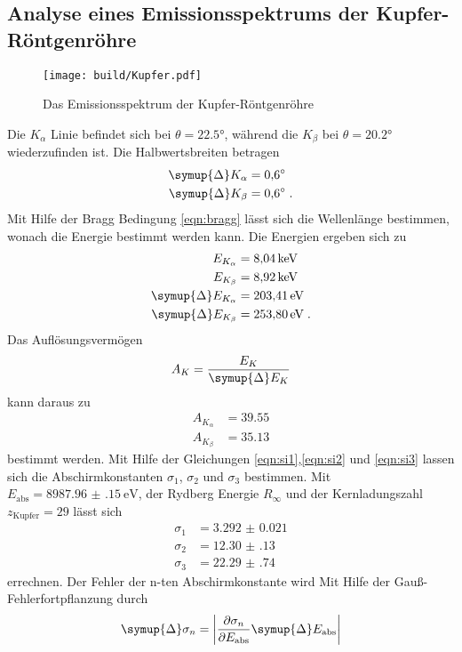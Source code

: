 \subsection{Analyse eines Emissionsspektrums der Kupfer-Röntgenröhre}
\begin{figure}
    \centering
    \caption{Das Emissionsspektrum der Kupfer-Röntgenröhre}
    \label{fig:Kupfer}
    \texttt{[image: build/Kupfer.pdf]}
\end{figure}
Die $K_\alpha$ Linie befindet sich bei  $\theta = \ang{22.5;;}$, während die $K_\beta$ bei  $\theta = \ang{20.2;;}$ wiederzufinden ist.
Die Halbwertsbreiten betragen
\begin{align*}
    \symup{\Delta}K_\alpha  &= \ang{0.6;;} \\
    \symup{\Delta}K_\beta   &= \ang{0.6;;} \; \text{.}
\end{align*}
Mit Hilfe der Bragg Bedingung \eqref{eqn:bragg} lässt sich die Wellenlänge bestimmen, wonach die Energie bestimmt werden kann.
Die Energien ergeben sich zu 
\begin{align*}
    E_{K_\alpha} & =  \SI{8.04}{\kilo\electronvolt} \\
    E_{K_\beta}  & =  \SI{8.92}{\kilo\electronvolt} \\
    \symup{\Delta}E_{K_\alpha} &= \SI{203.41}{\electronvolt} \\
    \symup{\Delta}E_{K_\beta}  &= \SI{253.80}{\electronvolt} \; \text{.}
\end{align*}
Das Auflösungsvermögen 
\begin{equation}
    A_K = \frac{E_K}{\symup{\Delta}E_K}
\end{equation}
kann daraus zu 
\begin{align*}
    A_{K_\alpha}&= \num{39.55} \\
    A_{K_\beta} &= \num{35.13}
\end{align*}
bestimmt werden.
Mit Hilfe der Gleichungen \eqref{eqn:si1},\eqref{eqn:si2} und \eqref{eqn:si3} lassen sich die Abschirmkonstanten $\sigma_1$, $\sigma_2$ und $\sigma_3$ bestimmen.
Mit $E_\text{abs} = \SI{8987.96(15)}{\electronvolt}$\cite{eabs}, der Rydberg Energie $R_\infty$ und der Kernladungszahl
$z_\text{Kupfer} = 29 $ lässt sich
\begin{align*}
    \sigma_1 &= \num{3.292(21)}    \\
    \sigma_2 &= \num{12.30(13)}  \\
    \sigma_3 &= \num{22.29(74)}
\end{align*}
errechnen.
Der Fehler der n-ten Abschirmkonstante wird Mit Hilfe der Gauß-Fehlerfortpflanzung durch
\begin{equation}
    \symup{\Delta} \sigma_n = \left | \frac{\partial \sigma_n}{\partial E_\text{abs} } \symup{\Delta} E_\text{abs} \right | 
\end{equation} 

